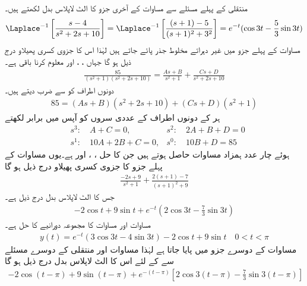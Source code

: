 منتقلی کے پہلے مسئلے سے مساوات  کے آخری جزو کا الٹ لاپلاس بدل لکھتے ہیں۔
\begin{align}\label{مساوات_مثال_لاپلاس_نصف_لہر_ب}
\Laplace^{-1}\left[\frac{s-4}{s^2+2s+10}\right]=\Laplace^{-1}\left[\frac{(s+1)-5}{(s+1)^2+3^2}\right]=e^{-t}(\cos 3t-\frac{5}{3}\sin 3t)
\end{align}
مساوات  کے پہلے جزو میں غیر دہراتے مخلوط جذر پائے جاتے ہیں لہٰذا اس کا جزوی کسری پھیلاو درج ذیل ہو گا جہاں ، ،  اور  معلوم کرنا باقی ہے۔
\begin{align*}
\frac{85}{(s^2+1)(s^2+2s+10)}=\frac{As+B}{s^2+1}+\frac{Cs+D}{s^2+2s+10}
\end{align*}
دونوں اطراف کو  سے ضرب دیتے ہیں۔
\begin{align*}
85=(As+B)(s^2+2s+10)+(Cs+D)(s^2+1)
\end{align*}
ہر  کے دونوں اطراف کے عددی سروں کو آپس میں برابر لکھتے
\begin{align*}
& s^3:\quad A+C=0, & s^2:\quad 2A+B+D=0\\
& s^1:\quad 10A+2B+C=0, & s^0:\quad 10B+D=85
\end{align*} 
ہوئے چار عدد ہمزاد مساوات حاصل ہوتے ہیں جن کا حل ، ،  اور  ہے۔یوں مساوات  کے پہلے جزو کا جزوی کسری پھیلاو درج ذیل ہو گا
\begin{align*}
\frac{-2s+9}{s^2+1}+\frac{2(s+1)-7}{(s+1)^2+9}
\end{align*}
جس کا الٹ لاپلاس بدل درج ذیل ہے۔
\begin{align}\label{مساوات_مثال_لاپلاس_نصف_لہر_پ}
-2\cos t+9\sin t+e^{-t}(2\cos 3t-\frac{7}{3}\sin 3t)
\end{align}
مساوات  اور مساوات  کا مجموعہ  دورانیے کا حل ہے۔
\begin{align}\label{مساوات_مثال_لاپلاس_نصف_لہر_ت}
y(t)=e^{-t}(3\cos 3t-4\sin 3t)-2\cos t+9\sin t\quad 0<t<\pi
\end{align}
مساوات  کے دوسرے جزو میں   پایا جاتا ہے لہٰذا مساوات  اور منتقلی کے دوسرے مسئلے سے  کے لئے  اس کا الٹ لاپلاس بدل درج ذیل ہو گا
\begin{align*}
-2\cos (t-\pi)+9\sin (t-\pi)+e^{-(t-\pi)}[2\cos 3(t-\pi)-\frac{7}{3}\sin 3(t-\pi)]
\end{align*}
